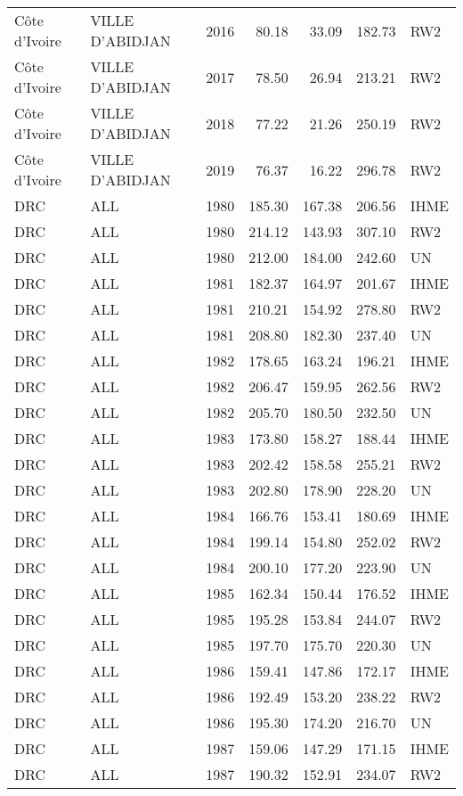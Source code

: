\begin{longtable}{lllrrrl}
  C\^{o}te d'Ivoire & VILLE D'ABIDJAN & 2016 & 80.18 & 33.09 & 182.73 & RW2 \\ 
  C\^{o}te d'Ivoire & VILLE D'ABIDJAN & 2017 & 78.50 & 26.94 & 213.21 & RW2 \\ 
  C\^{o}te d'Ivoire & VILLE D'ABIDJAN & 2018 & 77.22 & 21.26 & 250.19 & RW2 \\ 
  C\^{o}te d'Ivoire & VILLE D'ABIDJAN & 2019 & 76.37 & 16.22 & 296.78 & RW2 \\ 
  DRC & ALL & 1980 & 185.30 & 167.38 & 206.56 & IHME \\ 
  DRC & ALL & 1980 & 214.12 & 143.93 & 307.10 & RW2 \\ 
  DRC & ALL & 1980 & 212.00 & 184.00 & 242.60 & UN \\ 
  DRC & ALL & 1981 & 182.37 & 164.97 & 201.67 & IHME \\ 
  DRC & ALL & 1981 & 210.21 & 154.92 & 278.80 & RW2 \\ 
  DRC & ALL & 1981 & 208.80 & 182.30 & 237.40 & UN \\ 
  DRC & ALL & 1982 & 178.65 & 163.24 & 196.21 & IHME \\ 
  DRC & ALL & 1982 & 206.47 & 159.95 & 262.56 & RW2 \\ 
  DRC & ALL & 1982 & 205.70 & 180.50 & 232.50 & UN \\ 
  DRC & ALL & 1983 & 173.80 & 158.27 & 188.44 & IHME \\ 
  DRC & ALL & 1983 & 202.42 & 158.58 & 255.21 & RW2 \\ 
  DRC & ALL & 1983 & 202.80 & 178.90 & 228.20 & UN \\ 
  DRC & ALL & 1984 & 166.76 & 153.41 & 180.69 & IHME \\ 
  DRC & ALL & 1984 & 199.14 & 154.80 & 252.02 & RW2 \\ 
  DRC & ALL & 1984 & 200.10 & 177.20 & 223.90 & UN \\ 
  DRC & ALL & 1985 & 162.34 & 150.44 & 176.52 & IHME \\ 
  DRC & ALL & 1985 & 195.28 & 153.84 & 244.07 & RW2 \\ 
  DRC & ALL & 1985 & 197.70 & 175.70 & 220.30 & UN \\ 
  DRC & ALL & 1986 & 159.41 & 147.86 & 172.17 & IHME \\ 
  DRC & ALL & 1986 & 192.49 & 153.20 & 238.22 & RW2 \\ 
  DRC & ALL & 1986 & 195.30 & 174.20 & 216.70 & UN \\ 
  DRC & ALL & 1987 & 159.06 & 147.29 & 171.15 & IHME \\ 
  DRC & ALL & 1987 & 190.32 & 152.91 & 234.07 & RW2 \\ 

\end{longtable}
